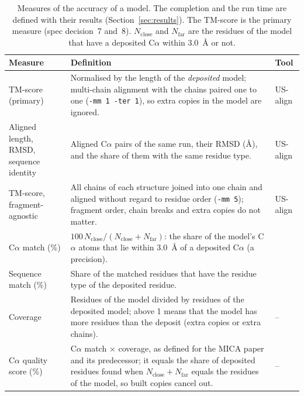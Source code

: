 \begin{table}[t]
\centering\small
\caption{Measures of the accuracy of a model. The completion and the run time are defined with their results (Section~\ref{sec:results}). The TM-score is the primary measure (spec decision~7 and~8). $N_\text{close}$ and $N_\text{far}$ are the residues of the model that have a deposited C$\alpha$ within 3.0~\AA{} or not.}
\label{tab:metrics}
\begin{tabularx}{\textwidth}{@{}>{\raggedright\arraybackslash}p{3.2cm}>{\raggedright\arraybackslash}X>{\raggedright\arraybackslash}p{3.1cm}@{}}
\toprule
Measure & Definition & Tool \\
\midrule
TM-score (primary) & Normalised by the length of the \emph{deposited} model; multi-chain alignment with the chains paired one to one (\texttt{-mm 1 -ter 1}), so extra copies in the model are ignored. & US-align \citep{zhang2022usalign,zhang2004tmscore} \\
Aligned length, RMSD, sequence identity & Aligned C$\alpha$ pairs of the same run, their RMSD (\AA{}), and the share of them with the same residue type. & US-align \\
TM-score, fragment-agnostic & All chains of each structure joined into one chain and aligned without regard to residue order (\texttt{-mm 5}); fragment order, chain breaks and extra copies do not matter. & US-align \\
C$\alpha$ match (\%) & $100\,N_\text{close}/(N_\text{close}+N_\text{far})$: the share of the model's C$\alpha$ atoms that lie within 3.0~\AA{} of a deposited C$\alpha$ (a precision). & \pcc{} \citep{liebschner2019phenix} \\
Sequence match (\%) & Share of the matched residues that have the residue type of the deposited residue. & \pcc{} \\
Coverage & Residues of the model divided by residues of the deposited model; above 1 means that the model has more residues than the deposit (extra copies or extra chains). & -- \\
C$\alpha$ quality score (\%) & C$\alpha$ match $\times$ coverage, as defined for the MICA paper and its predecessor; it equals the share of deposited residues found when $N_\text{close}+N_\text{far}$ equals the residues of the model, so built copies cancel out. & -- \\
\bottomrule
\end{tabularx}
\end{table}

